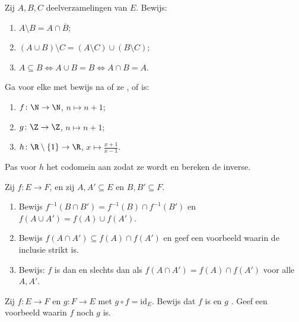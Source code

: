 \begin{exercise}[$\star$]\label{exo:b1:logic:6}
Zij $A, B, C$ deelverzamelingen van $E$. Bewijs:
\begin{enumerate}
  \item $A \setminus B = A \cap \overline{B}$;
  \item $(A \cup B) \setminus C = (A \setminus C) \cup (B \setminus
        C)$;
  \item $A \subseteq B \iff A \cup B = B \iff A \cap B = A$.
\end{enumerate}
\end{exercise}

\begin{exercise}[$\star\star$]\label{exo:b1:logic:7}
Ga voor elke  met bewijs na of ze ,  of
 is:
\begin{enumerate}
  \item $f \colon \N \to \N$, $n \mapsto n + 1$;
  \item $g \colon \Z \to \Z$, $n \mapsto n + 1$;
  \item $h \colon \R \setminus \{1\} \to \R$, $x \mapsto
        \frac{x+1}{x-1}$.
\end{enumerate}
Pas voor $h$ het codomein aan zodat ze  wordt en bereken de
inverse.
\end{exercise}

\begin{exercise}[$\star\star$]\label{exo:b1:logic:8}
Zij $f \colon E \to F$, en zij $A, A' \subseteq E$ en $B, B' \subseteq
F$.
\begin{enumerate}
  \item Bewijs $f^{-1}(B \cap B') = f^{-1}(B) \cap f^{-1}(B')$ en
        $f(A \cup A') = f(A) \cup f(A')$.
  \item Bewijs $f(A \cap A') \subseteq f(A) \cap f(A')$ en geef een
        voorbeeld waarin de inclusie strikt is.
  \item Bewijs: $f$ is  dan en slechts dan als $f(A \cap A') =
        f(A) \cap f(A')$ voor alle $A, A'$.
\end{enumerate}
\end{exercise}

\begin{exercise}[$\star\star$]\label{exo:b1:logic:9}
Zij $f \colon E \to F$ en $g \colon F \to E$ met $g \circ f =
\mathrm{id}_E$. Bewijs dat $f$  is en $g$ . Geef een
voorbeeld waarin $f$ noch $g$  is.
\end{exercise}

